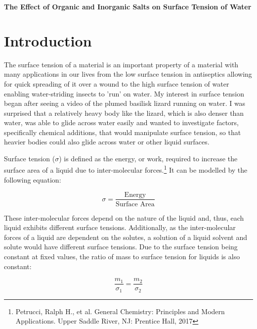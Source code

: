 \documentclass{article}
\begin{document}
\begin{center}
    \par{\huge \textbf{The Effect of Organic and Inorganic Salts on Surface Tension of Water}}
\end{center}


\section{Introduction}

\par{The surface tension of a material is an important property of a material with many applications in our lives from the low surface tension in antiseptics allowing for quick spreading of it over a wound to the high surface tension of water enabling water-striding insects to 'run' on water. My interest in surface tension began after seeing a video of the plumed basilisk lizard running on water. I was surprised that a relatively heavy body like the lizard, which is also denser than water, was able to glide across water easily and wanted to investigate factors, specifically chemical additions, that would manipulate surface tension, so that heavier bodies could also glide across water or other liquid surfaces.}

\par{Surface tension ($\sigma$) is defined as the energy, or work, required to increase the surface area of
a liquid due to inter-molecular forces.\footnote{Petrucci, Ralph H., et al. General Chemistry: Principles and Modern Applications. Upper Saddle River, NJ: Prentice Hall, 2017} It can be modelled by the following equation:}

\begin{equation}
    \sigma = \frac{\text{Energy}}{\text{Surface~Area}}
\end{equation}

\par{These inter-molecular forces depend on the nature of the liquid and, thus, each liquid exhibits different surface tensions. Additionally, as the inter-molecular forces of a liquid are dependent on the solutes, a solution of a liquid solvent and solute would have different surface tensions. Due to the surface tension being constant at fixed values, the ratio of mass to surface tension for liquids is also constant:}

\begin{equation}
    \frac{m_1}{\sigma_1} = \frac{m_2}{\sigma_2}
\end{equation}
\end{document}
